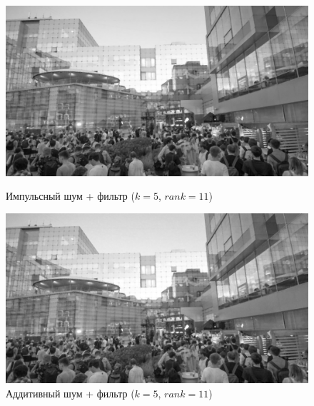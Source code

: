\documentclass[a4paper]{article}
\begin{document}
\begin{figure}[H]
    \begin{minipage}{0.49\textwidth}
        \centering \includegraphics[width=\textwidth]{images/3_nonlinear_filters/impulse - rang (k=5, rank=11).jpg}
        \caption{Импульсный шум + фильтр ($k = 5$, $rank = 11$)}
    \end{minipage}\hfill
    \begin{minipage}{0.49\textwidth}
        \centering \includegraphics[width=\textwidth]{images/3_nonlinear_filters/additive - rang (k=5, rank=11).jpg}
        \caption{Аддитивный шум + фильтр ($k = 5$, $rank = 11$)}
    \end{minipage}
\end{figure}
\end{document}
